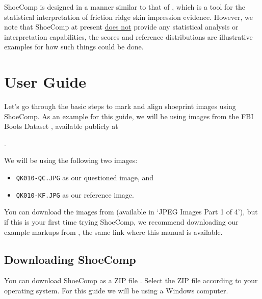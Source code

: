 \documentclass{csafedoc}
\begin{document}
ShoeComp is designed in a manner similar to that of
, which is a tool for the statistical
interpretation of friction ridge skin impression evidence. However, we note that ShoeComp
at present \underline{does not} provide any statistical analysis or interpretation
capabilities, the scores and reference distributions are illustrative examples for how
such things could be done.

\newpage
\chapter{User Guide}%
\label{sec:userguide}

Let's go through the basic steps to mark and align shoeprint images using ShoeComp. As an
example for this guide, we will be using images from the FBI Boots Dataset \cite{boots}, available
publicly at

\begin{center}
	.
\end{center}

We will be using the following two images:

\begin{itemize}
	\item \texttt{QK010-QC.JPG} as our questioned image, and
	\item \texttt{QK010-KF.JPG} as our reference image.
\end{itemize}

You can download the images from 
(available in `JPEG Images Part 1 of 4'), but if this is your first time trying ShoeComp,
we recommend downloading our example markups from
, the same link where this manual is
available.

\section{Downloading ShoeComp}

You can download ShoeComp as a ZIP file .
Select the ZIP file according to your operating system. For this guide we will be using a
Windows computer.
\end{document}
